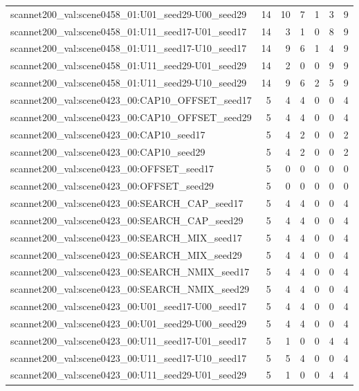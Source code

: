\begin{table}[t]
\begin{tabular}{lrrrrrr}
scannet200\_val:scene0458\_01:U01\_seed29-U00\_seed29 & 14 & 10 & 7 & 1 & 3 & 9 \\
scannet200\_val:scene0458\_01:U11\_seed17-U01\_seed17 & 14 & 3 & 1 & 0 & 8 & 9 \\
scannet200\_val:scene0458\_01:U11\_seed17-U10\_seed17 & 14 & 9 & 6 & 1 & 4 & 9 \\
scannet200\_val:scene0458\_01:U11\_seed29-U01\_seed29 & 14 & 2 & 0 & 0 & 9 & 9 \\
scannet200\_val:scene0458\_01:U11\_seed29-U10\_seed29 & 14 & 9 & 6 & 2 & 5 & 9 \\
scannet200\_val:scene0423\_00:CAP10\_OFFSET\_seed17 & 5 & 4 & 4 & 0 & 0 & 4 \\
scannet200\_val:scene0423\_00:CAP10\_OFFSET\_seed29 & 5 & 4 & 4 & 0 & 0 & 4 \\
scannet200\_val:scene0423\_00:CAP10\_seed17 & 5 & 4 & 2 & 0 & 0 & 2 \\
scannet200\_val:scene0423\_00:CAP10\_seed29 & 5 & 4 & 2 & 0 & 0 & 2 \\
scannet200\_val:scene0423\_00:OFFSET\_seed17 & 5 & 0 & 0 & 0 & 0 & 0 \\
scannet200\_val:scene0423\_00:OFFSET\_seed29 & 5 & 0 & 0 & 0 & 0 & 0 \\
scannet200\_val:scene0423\_00:SEARCH\_CAP\_seed17 & 5 & 4 & 4 & 0 & 0 & 4 \\
scannet200\_val:scene0423\_00:SEARCH\_CAP\_seed29 & 5 & 4 & 4 & 0 & 0 & 4 \\
scannet200\_val:scene0423\_00:SEARCH\_MIX\_seed17 & 5 & 4 & 4 & 0 & 0 & 4 \\
scannet200\_val:scene0423\_00:SEARCH\_MIX\_seed29 & 5 & 4 & 4 & 0 & 0 & 4 \\
scannet200\_val:scene0423\_00:SEARCH\_NMIX\_seed17 & 5 & 4 & 4 & 0 & 0 & 4 \\
scannet200\_val:scene0423\_00:SEARCH\_NMIX\_seed29 & 5 & 4 & 4 & 0 & 0 & 4 \\
scannet200\_val:scene0423\_00:U01\_seed17-U00\_seed17 & 5 & 4 & 4 & 0 & 0 & 4 \\
scannet200\_val:scene0423\_00:U01\_seed29-U00\_seed29 & 5 & 4 & 4 & 0 & 0 & 4 \\
scannet200\_val:scene0423\_00:U11\_seed17-U01\_seed17 & 5 & 1 & 0 & 0 & 4 & 4 \\
scannet200\_val:scene0423\_00:U11\_seed17-U10\_seed17 & 5 & 5 & 4 & 0 & 0 & 4 \\
scannet200\_val:scene0423\_00:U11\_seed29-U01\_seed29 & 5 & 1 & 0 & 0 & 4 & 4 \\

\end{tabular}
\end{table}
